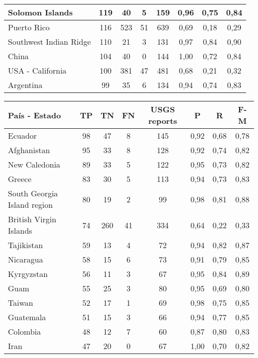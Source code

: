 {\begin{table}[!ht]
\begin{tabular}{|l|ccc|c|ccc|}
Solomon Islands	 & 119 	 & 40 	 & 5 	& 159	 & 0,96 &	0,75 &	0,84 \\ \hline
Puerto Rico	 & 116 	 & 523 	 & 51 	& 639	 & 0,69 &	0,18 &	0,29 \\ \hline
Southwest Indian Ridge	 & 110 	 & 21 	 & 3 	& 131	 & 0,97 &	0,84 &	0,90 \\ \hline
China	 & 104 	 & 40 	 & 0   	& 144	 & 1,00 &	0,72 &	0,84 \\ \hline
USA - California	 & 100 	 & 381 	 & 47 	& 481	 & 0,68 &	0,21 &	0,32 \\ \hline
Argentina	 & 99 	 & 35 	 & 6 	& 134	 & 0,94 &	0,74 &	0,83 \\ \hline
   \end{tabular}
\end{table}}

{\small
\begin{table}[!ht]
\centering
  \begin{tabular}{|l|ccc|c|ccc|}
  \hline
  País - Estado & TP & TN & FN & USGS reports & P & R & F-M \\
  \hline \hline
Ecuador	 & 98 	 & 47 	 & 8 	& 145	 & 0,92 &	0,68 &	0,78 \\ \hline
Afghanistan	 & 95 	 & 33 	 & 8 	& 128	 & 0,92 &	0,74 &	0,82 \\ \hline
New Caledonia	 & 89 	 & 33 	 & 5 	& 122	 & 0,95 &	0,73 &	0,82 \\ \hline
Greece	 & 83 	 & 30 	 & 5 	& 113	 & 0,94 &	0,73 &	0,83 \\ \hline
South Georgia Island region	 & 80 	 & 19 	 & 2 	& 99	 & 0,98 &	0,81 &	0,88 \\ \hline
British Virgin Islands	 & 74 	 & 260 	 & 41 	& 334	 & 0,64 &	0,22 &	0,33 \\ \hline
Tajikistan	 & 59 	 & 13 	 & 4 	& 72	 & 0,94 &	0,82 &	0,87 \\ \hline
Nicaragua	 & 58 	 & 15 	 & 6 	& 73	 & 0,91 &	0,79 &	0,85 \\ \hline
Kyrgyzstan	 & 56 	 & 11 	 & 3 	& 67	 & 0,95 &	0,84 &	0,89 \\ \hline
Guam	 & 55 	 & 25 	 & 3 	& 80	 & 0,95 &	0,69 &	0,80 \\ \hline
Taiwan	 & 52 	 & 17 	 & 1 	& 69	 & 0,98 &	0,75 &	0,85 \\ \hline
Guatemala	 & 51 	 & 15 	 & 3 	& 66	 & 0,94 &	0,77 &	0,85 \\ \hline
Colombia	 & 48 	 & 12 	 & 7 	& 60	 & 0,87 &	0,80 &	0,83 \\ \hline
Iran	 & 47 	 & 20 	 & 0   	& 67	 & 1,00 &	0,70 &	0,82 \\ \hline

\end{tabular}
\end{table}}
